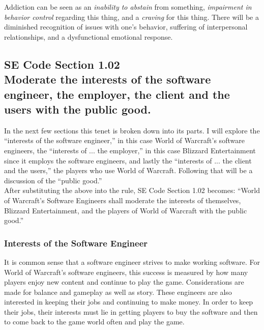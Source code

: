 \documentclass[11pt]{article}
\begin{document}
\begin{multicols}{2}
Addiction can be seen as an \emph{inability to abstain} from something, \emph{impairment in behavior control} regarding this thing, and a \emph{craving} for this thing. There will be a diminished recognition of issues with one's behavior, suffering of interpersonal relationships, and a dysfunctional emotional response. \cite{DefinitionOfAddiction}

\subsection{SE Code Section 1.02\\Moderate the interests of the software engineer, the employer, the client and the users with the public good.}
In the next few sections this tenet is broken down into its parts. I will explore the ``interests of the software engineer,'' in this case World of Warcraft's software engineers, the ``interests of ... the employer,'' in this case Blizzard Entertainment since it employs the software engineers, and lastly the ``interests of ... the client and the users,'' the players who use World of Warcraft. Following that will be a discussion of the ``public good.''\\
After substituting the above into the rule, SE Code Section 1.02 becomes: ``World of Warcraft's Software Engineers shall moderate the interests of themselves, Blizzard Entertainment, and the players of World of Warcraft with the public good.''

\subsubsection{Interests of the Software Engineer}
It is common sense that a software engineer strives to make working software. For World of Warcraft's software engineers, this success is measured by how many players enjoy new content and continue to play the game. Considerations are made for balance and gameplay as well as story. \cite{DevWatercooler} These engineers are also interested in keeping their jobs and continuing to make money. In order to keep their jobs, their interests must lie in getting players to buy the software and then to come back to the game world often and play the game.


\end{multicols}
\end{document}

